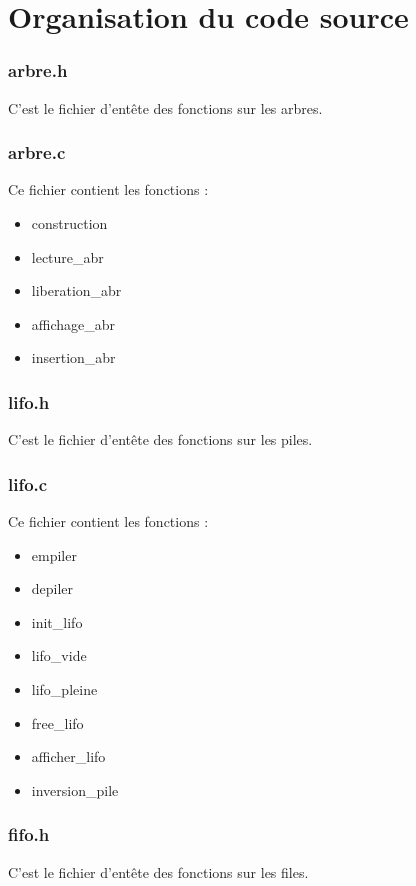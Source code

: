 \documentclass{report}
\newenvironment{myindentpar}[1]%
    {\begin{list}{}%
             {\setlength{\leftmargin}{#1}}%
             \item[]%
     }
     {\end{list}}
\begin{document}
\newpage
\section{Organisation du code source}\label{source}
\subsubsection{arbre.h}
C'est le fichier d'entête des fonctions sur les arbres.

\subsubsection{arbre.c}
Ce fichier contient les fonctions :
\begin{myindentpar}{2cm}
\begin{itemize}
    \item construction
    \item lecture\_abr
    \item liberation\_abr
    \item affichage\_abr
    \item insertion\_abr
\end{itemize}
\end{myindentpar}

\subsubsection{lifo.h}
C'est le fichier d'entête des fonctions sur les piles.

\subsubsection{lifo.c}
Ce fichier contient les fonctions :
\begin{myindentpar}{2cm}
\begin{itemize}
    \item empiler
    \item depiler
    \item init\_lifo
    \item lifo\_vide
    \item lifo\_pleine
    \item free\_lifo
    \item afficher\_lifo
    \item inversion\_pile
\end{itemize}
\end{myindentpar}

\subsubsection{fifo.h}
C'est le fichier d'entête des fonctions sur les files.
\end{document}
